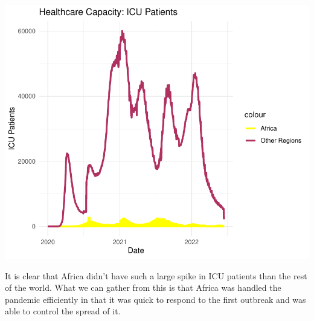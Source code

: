 \documentclass[12pt,preprint, authoryear]{elsarticle}
\let\origfigure\figure
\let\endorigfigure\endfigure
\renewenvironment{figure}[1][2] {
    \expandafter\origfigure\expandafter[H]
} {
    \endorigfigure
}
\numberwithin{equation}{section}
\numberwithin{figure}{section}
\numberwithin{table}{section}
\begin{document}
\begin{figure}

{\centering \includegraphics{Q1_files/figure-latex/Figure4-1} 

}

\caption{ICU Patients \label{Figure4}}\label{fig:Figure4}
\end{figure}

It is clear that Africa didn't have such a large spike in ICU patients
than the rest of the world. What we can gather from this is that Africa
was handled the pandemic efficiently in that it was quick to respond to
the first outbreak and was able to control the spread of it.

\begin{Shaded}
\begin{Highlighting}[]
\end{Highlighting}
\end{Shaded}
\end{document}

